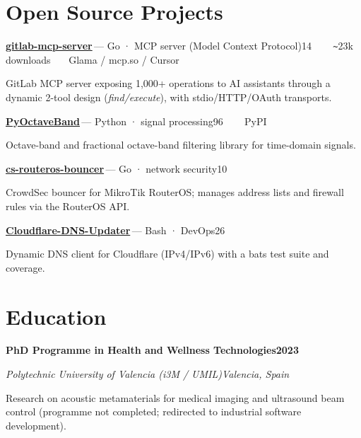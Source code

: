 \documentclass[11pt,a4paper]{article}
\let\jmrpsection\section
\renewcommand{\section}[1]{\needspace{4\baselineskip}\jmrpsection{#1}}
\newcommand{\cventry}[4]{%
  \textbf{#1}\hfill\textbf{#4}\par
  {\color{muted}\textit{#2}\hfill\textit{#3}}\par
  \vspace{2pt}
}
\newcommand{\cvproject}[3]{%
  \textbf{#1}\,\textcolor{muted}{\small— #2}\hfill{\small\textcolor{accent}{#3}}\par
  \vspace{1pt}
}
\newcommand{\divider}{\textcolor{muted}{\ \raisebox{0.4ex}{\scriptsize$\bullet$}\ }}
\begin{document}
\section{Open Source Projects}
\cvproject{\href{https://github.com/jmrplens/gitlab-mcp-server}{gitlab-mcp-server}}{Go · MCP server (Model Context Protocol)}{14\,\faStar \ \divider\ \texttt{\textasciitilde}23k downloads \divider\ Glama / mcp.so / Cursor}
GitLab MCP server exposing 1,000+ operations to AI assistants through a dynamic 2-tool design (\textit{find/execute}), with stdio/HTTP/OAuth transports.\par\vspace{4pt}

\cvproject{\href{https://github.com/jmrplens/PyOctaveBand}{PyOctaveBand}}{Python · signal processing}{96\,\faStar \ \divider\ PyPI}
Octave-band and fractional octave-band filtering library for time-domain signals.\par\vspace{4pt}

\cvproject{\href{https://github.com/jmrplens/cs-routeros-bouncer}{cs-routeros-bouncer}}{Go · network security}{10\,\faStar}
CrowdSec bouncer for MikroTik RouterOS; manages address lists and firewall rules via the RouterOS API.\par\vspace{4pt}

\cvproject{\href{https://github.com/jmrplens/Cloudflare-DNS-Updater}{Cloudflare-DNS-Updater}}{Bash · DevOps}{26\,\faStar}
Dynamic DNS client for Cloudflare (IPv4/IPv6) with a bats test suite and coverage.

\section{Education}
\cventry{PhD Programme in Health and Wellness Technologies}{Polytechnic University of Valencia (i3M / UMIL)}{Valencia, Spain}{2023}
{\color{muted}\small Research on acoustic metamaterials for medical imaging and ultrasound beam control (programme not completed; redirected to industrial software development).}\par\vspace{4pt}
\end{document}
